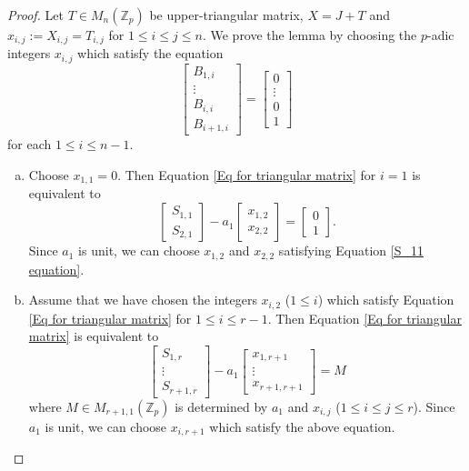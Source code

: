 \documentclass[12pt,a4paper]{article}
\begin{document}
	\begin{proof}
		Let $T \in M_n(\mathbb{Z}_p)$ be upper-triangular matrix, $X=J+T$ and $x_{i,j}:= X_{i,j}=T_{i,j}$ for $1 \leq i \leq j \leq n$. We prove the lemma by choosing the $p$-adic integers $x_{i,j}$ which satisfy the equation
		\begin{equation} \label{Eq for triangular matrix}
			\begin{bmatrix}
				B_{1,i} \\
				\vdots\\
				B_{i,i}\\
				B_{i+1,i}
			\end{bmatrix} = \begin{bmatrix}
			0 \\
			\vdots\\
			0 \\
			1
			\end{bmatrix}
		\end{equation}
		for each $1 \leq i \leq n-1$.
		\begin{enumerate}[(a)]
			\item Choose $x_{1,1} = 0$. Then Equation \eqref{Eq for triangular matrix} for $i=1$ is equivalent to
			\begin{equation} \label{S_11 equation}
				\begin{bmatrix}
					S_{1,1} \\
					S_{2,1}
				\end{bmatrix} - a_1 \begin{bmatrix}
				x_{1,2}\\
				x_{2,2}
				\end{bmatrix} = \begin{bmatrix}
				0 \\
				1
				\end{bmatrix}.
			\end{equation}
			Since $a_1$ is unit, we can choose $x_{1,2}$ and $x_{2,2}$ satisfying Equation \eqref{S_11 equation}.
			\item Assume that we have chosen the integers $x_{i,2}$ ($1 \leq i$) which satisfy Equation \eqref{Eq for triangular matrix} for $1 \leq i \leq r-1$. Then Equation \eqref{Eq for triangular matrix} is equivalent to
			\begin{equation*}
				\begin{bmatrix}
					S_{1,r}\\
					\vdots\\
					S_{r+1,r}
				\end{bmatrix} - a_1 \begin{bmatrix}
				x_{1,r+1}\\
				\vdots \\
				x_{r+1,r+1}
				\end{bmatrix} = M
			\end{equation*}
			where $M \in M_{r+1,1}(\mathbb{Z}_p)$ is determined by $a_1$ and $x_{i,j}$ ($1 \leq i \leq j \leq r$). Since $a_1$ is unit, we can choose $x_{i,r+1}$ which satisfy the above equation.
		\end{enumerate}
	\end{proof}
\end{document}

